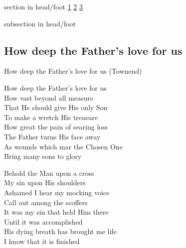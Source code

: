 \documentclass{beamer}
\begin{document}
{
{ 
 {
 \begin{beamercolorbox}[ht=4.5ex,dp=1.5ex,%
      leftskip=.3cm,rightskip=.3cm plus1fil]{section in head/foot}
 \fontsize{12}{25}\selectfont 
\hyperlink{How deep the Father's love for us[](Townend)1}{1}
\hyperlink{How deep the Father's love for us[](Townend)2}{2}
\hyperlink{How deep the Father's love for us[](Townend)3}{3}
 
 \end{beamercolorbox}%
  \begin{beamercolorbox}[ht=2.5ex,dp=1.125ex,%
   leftskip=.3cm,rightskip=.3cm plus1fil]{subsection in head/foot}
   \insertauthor
 \end{beamercolorbox}%
 }
}
\subsection{ How deep the Father's love for us }

\hypertarget{How deep the Father's love for us[](Townend)1}{}
\begin{frame}{How deep the Father's love for us (Townend)}
\fontsize{ 18 }{ 23 }\selectfont

How deep the Father's love for us\\ 
How vast beyond all measure\\ 
That He should give His only Son\\ 
To make a wretch His treasure\\ 
How great the pain of searing loss\\ 
The Father turns His face away\\ 
As wounds which mar the Chosen One\\ 
Bring many sons to glory 

\end{frame}

\hypertarget{How deep the Father's love for us[](Townend)2}{}
\begin{frame}{}
\fontsize{ 18 }{ 23 }\selectfont

Behold the Man upon a cross\\ 
My sin upon His shoulders\\ 
Ashamed I hear my mocking voice\\ 
Call out among the scoffers\\ 
It was my sin that held Him there\\ 
Until it was accomplished\\ 
His dying breath has brought me life\\ 
I know that it is finished 


\end{frame}}
\end{document}
